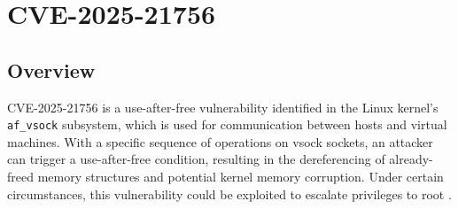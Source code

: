\chapter{CVE-2025-21756}\label{chapter:cve}

\section{Overview}
CVE-2025-21756 \cite{bib:cve-2025-21756} is a use-after-free vulnerability identified in the Linux kernel's \texttt{af\_vsock} \cite{bib:af-vsock} subsystem, which is used for communication between hosts and virtual machines. With a specific sequence of operations on vsock sockets, an attacker can trigger a use-after-free condition, resulting in the dereferencing of already-freed memory structures and potential kernel memory corruption. Under certain circumstances, this vulnerability could be exploited to escalate privileges to root \cite{bib:exploit-cve-2025-21756}.


